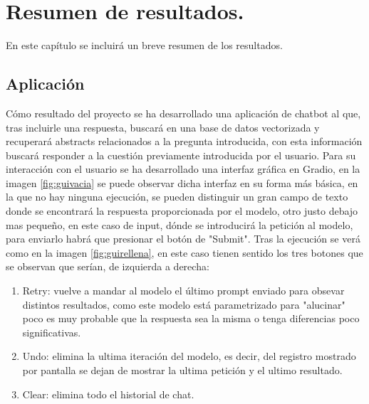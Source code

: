 
\section{Resumen de resultados.}

En este capítulo se incluirá un breve resumen de los resultados.

\subsection{Aplicación}

Cómo resultado del proyecto se ha desarrollado una aplicación de chatbot al que, tras incluirle una respuesta, buscará en una base de datos vectorizada y recuperará abstracts relacionados a la pregunta introducida, con esta información buscará responder a la cuestión previamente introducida por el usuario. Para su interacción con el usuario se ha desarrollado una interfaz gráfica en Gradio, en la imagen \ref{fig:guivacia} se puede observar dicha interfaz en su forma más básica, en la que no hay ninguna ejecución, se pueden distinguir un gran campo de texto donde se encontrará la respuesta proporcionada por el modelo, otro justo debajo mas pequeño, en este caso de input, dónde se introducirá la petición al modelo, para enviarlo habrá que presionar el botón de "Submit". Tras la ejecución se verá como en la imagen \ref{fig:guirellena}, en este caso tienen sentido los tres botones que se observan que serían, de izquierda a derecha:

\begin{enumerate}

    \item Retry: vuelve a mandar al modelo el último prompt enviado para obsevar distintos resultados, como este modelo está parametrizado para "alucinar" poco es muy probable que la respuesta sea la misma o tenga diferencias poco significativas.
    
    \item Undo: elimina la ultima iteración del modelo, es decir, del registro mostrado por pantalla se dejan de mostrar la ultima petición y el ultimo resultado.
    
    \item Clear: elimina todo el historial de chat.
    
\end{enumerate}

